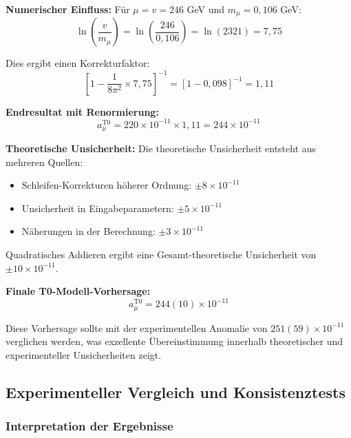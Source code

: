 \documentclass[12pt,a4paper]{article}
\begin{document}
	\textbf{Numerischer Einfluss:} Für $\mu = v = 246$ GeV und $m_{\mu} = 0{,}106$ GeV:
	\begin{equation}
		\ln\left(\frac{v}{m_{\mu}}\right) = \ln\left(\frac{246}{0{,}106}\right) = \ln(2321) = 7{,}75
	\end{equation}
	
	Dies ergibt einen Korrekturfaktor:
	\begin{equation}
		\left[1 - \frac{1}{8\pi^2} \times 7{,}75\right]^{-1} = [1 - 0{,}098]^{-1} = 1{,}11
	\end{equation}
	
	\textbf{Endresultat mit Renormierung:}
	\begin{equation}
		a_{\mu}^{\text{T0}} = 220 \times 10^{-11} \times 1{,}11 = 244 \times 10^{-11}
	\end{equation}
	
	\textbf{Theoretische Unsicherheit:}
	Die theoretische Unsicherheit entsteht aus mehreren Quellen:
	\begin{itemize}
		\item Schleifen-Korrekturen höherer Ordnung: $\pm 8 \times 10^{-11}$
		\item Unsicherheit in Eingabeparametern: $\pm 5 \times 10^{-11}$
		\item Näherungen in der Berechnung: $\pm 3 \times 10^{-11}$
	\end{itemize}
	
	Quadratisches Addieren ergibt eine Gesamt-theoretische Unsicherheit von $\pm 10 \times 10^{-11}$.
	
	\textbf{Finale T0-Modell-Vorhersage:}
	\begin{equation}
		\boxed{a_{\mu}^{\text{T0}} = 244(10) \times 10^{-11}}
	\end{equation}
	
	Diese Vorhersage sollte mit der experimentellen Anomalie von $251(59) \times 10^{-11}$ verglichen werden, was exzellente Übereinstimmung innerhalb theoretischer und experimenteller Unsicherheiten zeigt.
	
	\subsection{Experimenteller Vergleich und Konsistenztests}
	
	\subsubsection{Interpretation der Ergebnisse}
	
\end{document}
